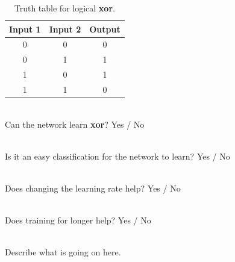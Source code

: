 \documentclass[a4paper,10pt]{article}
\begin{document}
\begin{table}[ht]
 \centering
 \begin{tabular}[t]{ccc}
Input 1 & Input 2 & Output\\ \hline
0 & 0 & 0\\
0 & 1 & 1 \\
1 & 0 & 1 \\
1 & 1 & 0 \\

\end{tabular} \caption{Truth table for logical \textbf{xor}.}
 \label{tbl:xor}
\end{table}


\ \\ Can the network learn \textbf{xor}?    Yes / No   

\ \\ Is it an easy classification for the network to learn? Yes / No

\ \\ Does changing the learning rate help?    Yes / No   

\ \\ Does training for longer help?    Yes / No   

\ \\  Describe what is going on here.
\end{document}

